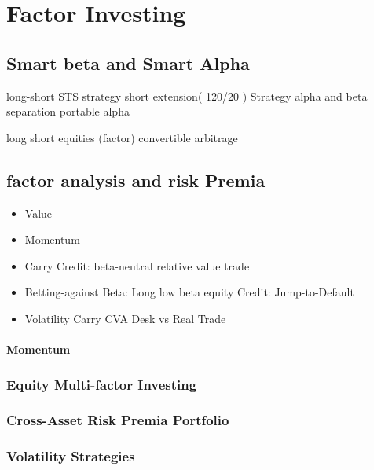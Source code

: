 \documentclass[11pt, openany]{book}              %
\begin{document}
\chapter{Factor Investing}
 
\section{Smart beta and Smart Alpha}                  %

long-short STS strategy
short extension( 120/20 ) Strategy
alpha and beta separation
portable alpha 

long short equities (factor) 
convertible arbitrage

\section{factor analysis and risk Premia}

\begin{itemize}
	\item Value
	\item Momentum
	\item Carry
		\subitem Credit: beta-neutral relative value trade
	\item Betting-against Beta: Long low beta equity
		\subitem Credit: Jump-to-Default
	\item Volatility Carry
		\subitem CVA Desk vs Real Trade
\end{itemize}



\subsubsection{Momentum}



\subsection{Equity Multi-factor Investing}

\subsection{Cross-Asset Risk Premia Portfolio}

\subsection{Volatility Strategies}
\end{document}
